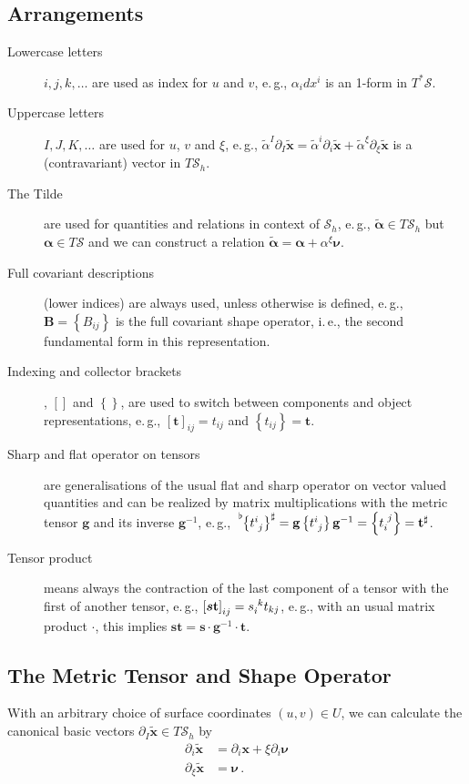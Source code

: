 \documentclass[a4paper,11pt]{scrartcl}
\newcommand{\surf}{\mathcal{S}}
\newcommand{\surfh}{\surf_{h}}
\newcommand{\xb}{\mathbf{x}}
\newcommand{\txb}{\tilde{\xb}}
\newcommand{\nub}{\bm{\nu}}
\newcommand{\gb}{\mathbf{g}}
\newcommand{\tb}{\mathbf{t}}
\newcommand{\Bb}{\mathbf{B}}
\newcommand{\alphab}{\bm{\alpha}}
\newcommand{\formPeriod}{\,\text{.}}
\newcommand{\ie}{i.\,e.}%
\newcommand{\eg}{e.\,g.}
\begin{document}
\subsection{Arrangements}
\begin{description}
  \item[Lowercase letters] \( i,j,k,\ldots \) are used as index for \( u \) and \( v \), \eg, \( \alpha_{i}dx^{i} \) is an 1-form in \( T^{*}\surf \).
  \item[Uppercase letters] \( I,J,K,\ldots \)  are used for \( u \), \( v \) and \( \xi \), \eg, 
  \( \tilde{\alpha}^{I}\partial_{I}\txb = \tilde{\alpha}^{i}\partial_{i}\txb +\tilde{\alpha}^{\xi}\partial_{\xi}\txb \) is a (contravariant) vector in \( T\surfh \).
  \item[The Tilde] are used for quantities and relations in context of \( \surfh \),
        \eg, \(  \tilde{\alphab}\in T\surfh \) but \( \alphab\in  T\surf\) and we can construct a relation \( \tilde{\alphab} = \alphab + \alpha^{\xi}\nub \).
  \item[Full covariant descriptions] (lower indices) are always used, unless otherwise is defined,
        \eg, \( \Bb = \left\{ B_{ij} \right\} \) is the full covariant shape operator, \ie, the second fundamental form in this representation.
  \item[Indexing and collector brackets], \( \left[  \right] \) and \( \left\{  \right\} \), are used to switch between components and object representations, \eg,
      \( \left[ \tb \right]_{ij} = t_{ij} \) and \( \left\{ t_{ij} \right\} = \tb \).
  \item[Sharp and flat operator on tensors] are generalisations of the usual flat and sharp operator on vector valued quantities and can be realized by matrix multiplications with the
  metric tensor \( \gb \) and its inverse \( \gb^{-1} \),
          \eg, \( \tensor[^\flat]{\left\{ \tensor{t}{^{i}_{j}} \right\}}{^{\sharp}} = \gb\left\{ \tensor{t}{^{i}_{j}} \right\}\gb^{-1} 
                  =  \left\{ \tensor{t}{_{i}^{j}} \right\} = \tb^{\sharp} \).
  \item[Tensor product] means always the contraction of the last component of a tensor with the first of another tensor,
          \eg, \( \left[ \bm{s}\tb \right]_{ij} = \tensor{s}{_{i}^{k}}t_{kj} \), \eg, with an usual matrix product \( \cdot \), 
            this implies \( \bm{s}\tb = \bm{s}\cdot\gb^{-1}\cdot\tb \).
\end{description}

\subsection{The Metric Tensor and Shape Operator}
With an arbitrary choice of surface coordinates \( (u,v)\in U \), we can calculate the canonical basic vectors \( \partial_{I}\txb\in T\surfh \) by
\begin{align}
  \partial_{i}\txb &= \partial_{i}\xb + \xi\partial_{i}\nub \\
  \partial_{\xi}\txb &= \nub \formPeriod
\end{align}
\end{document}
